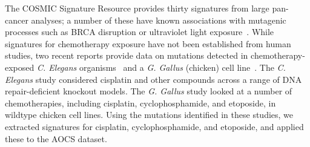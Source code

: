 The COSMIC Signature Resource provides thirty signatures from large pan-cancer analyses; a number of these have known associations with mutagenic processes such as BRCA disruption or ultraviolet light exposure~\cite{364242}. While signatures for chemotherapy exposure have not been established from human studies, two recent reports provide data on mutations detected in chemotherapy-exposed \textit{C. Elegans} organisms~\cite{Meier_2014} and a \textit{G. Gallus} (chicken) cell line~\cite{Szikriszt_2016}. The \textit{C. Elegans} study considered cisplatin and other compounds across a range of DNA repair-deficient knockout models. The \textit{G. Gallus} study looked at a number of chemotherapies, including cisplatin, cyclophosphamide, and etoposide, in wildtype chicken cell lines. Using the mutations identified in these studies, we extracted signatures for cisplatin, cyclophosphamide, and etoposide, and applied these to the AOCS dataset.